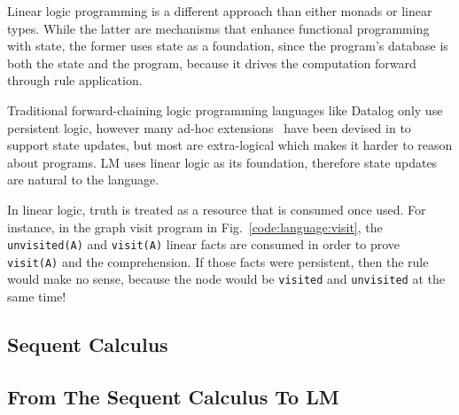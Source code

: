Linear logic programming is a different approach than either monads or linear
types.  While the latter are mechanisms that enhance functional programming with
state, the former uses state as a foundation, since the program's database is
both the state and the program, because it drives the computation forward
through rule application.

Traditional forward-chaining logic programming languages like
Datalog only use persistent logic, however many ad-hoc
extensions~\cite{Liu98extendingdatalog,Ludascher95alogical} have been devised
in to support state updates, but most are extra-logical which makes it harder
to reason about programs. LM uses linear logic as its foundation, therefore
state updates are natural to the language.

In linear logic, truth is treated as a resource that is consumed once used. For
instance, in the graph visit program in Fig.~\ref{code:language:visit}, the
\texttt{unvisited(A)} and \texttt{visit(A)} linear facts are consumed in order
to prove \texttt{visit(A)} and the comprehension. If those facts were
persistent, then the rule would make no sense, because the node would be
\texttt{visited} and \texttt{unvisited} at the same time!

\subsection{Sequent Calculus}



\subsection{From The Sequent Calculus To LM}

